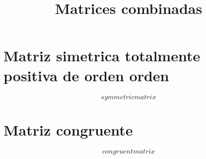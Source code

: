 \documentclass[12pt]{article}
\begin{document}
\title{Matrices combinadas}
\maketitle

\section*{Matriz simetrica totalmente positiva de orden {{orden}}}

$${{symmetricmatrix}}$$

\section*{Matriz congruente}

$${{congruentmatrix}}$$
\end{document}
